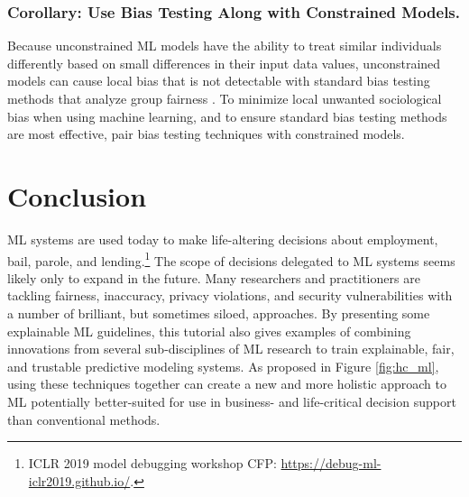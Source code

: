 \documentclass[sigconf]{acmart}
\begin{document}
\subsubsection{Corollary: Use Bias Testing  Along with Constrained Models.} Because unconstrained ML models have the ability to treat similar individuals differently based on small differences in their input data values, unconstrained models can cause local bias that is not detectable with standard bias testing methods that analyze group fairness \cite{dwork2012fairness}. To minimize local unwanted sociological bias when using machine learning, and to ensure standard bias testing methods are most effective, pair bias testing techniques with constrained models.

\section{Conclusion} \label{sec:conclusion}

ML systems are used today to make life-altering decisions about employment, bail, parole, and lending.\footnote{ICLR 2019 model debugging workshop CFP: \url{https://debug-ml-iclr2019.github.io/}.} The scope of decisions delegated to ML systems seems likely only to expand in the future. Many researchers and practitioners are tackling fairness, inaccuracy, privacy violations, and security vulnerabilities with a number of brilliant, but sometimes siloed, approaches. By presenting some explainable ML guidelines, this tutorial also gives examples of combining innovations from several sub-disciplines of ML research to train explainable, fair, and trustable predictive modeling systems. As proposed in Figure \ref{fig:hc_ml}, using these techniques together can create a new and more holistic approach to ML potentially better-suited for use in business- and life-critical decision support than conventional methods.
\end{document}
